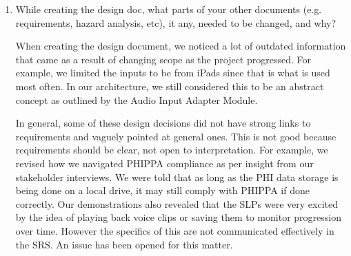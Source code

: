 \documentclass[12pt, titlepage]{article}
\begin{document}
\begin{enumerate}
        Almost all of our design decisions stemmed from our supervisor, who acts as a proxy to our clients (SLPs). Others were software decisions made through group discussions. We were told that most SLPs use iPads for their sessions, so it brought up the idea of the audio input adapter module, as future expansions would need some abstract adapter to interface with various OS or hardware. We determined that an audio capture module would be helpful as well in case any pre-processing was needed. We were also told that SLPs would love to have a replay feature that lets them play back recordings from a session, so a save feature may be integrated here too. For session management, patient management, practice items, and dashboard element modules, we conducted interviews with our stakeholders using wireframe sketches. These discussions inspired a need for related features, so we partitioned them into related, abstract modules. A big part of our design is the speech analysis portion so it was a common understanding between us and the supervisors that this was a necessary portion. This is essential so we could put other ML models, or analysis mechanisms in general, even if they are unrelated to SLP needs. For example, it leaves it open for accent coaches as well. 

  \item While creating the design doc, what parts of your other documents (e.g.
  requirements, hazard analysis, etc), it any, needed to be changed, and why?
  
      When creating the design document, we noticed a lot of outdated information that came as a result of changing scope as the project progressed. For example, we limited the inputs to be from iPads since that is what is used most often. In our architecture, we still considered this to be an abstract concept as outlined by the Audio Input Adapter Module. 
      
      In general, some of these design decisions did not have strong links to requirements and vaguely pointed at general ones. This is not good because requirements should be clear, not open to interpretation. For example, we revised how we navigated PHIPPA compliance as per insight from our stakeholder interviews. We were told that as long as the PHI data storage is being done on a local drive, it may still comply with PHIPPA if done correctly. Our demonstrations also revealed that the SLPs were very excited by the idea of playing back voice clips or saving them to monitor progression over time. However the specifics of this are not communicated effectively in the SRS. An issue has been opened for this matter. 



\end{enumerate}
\end{document}
